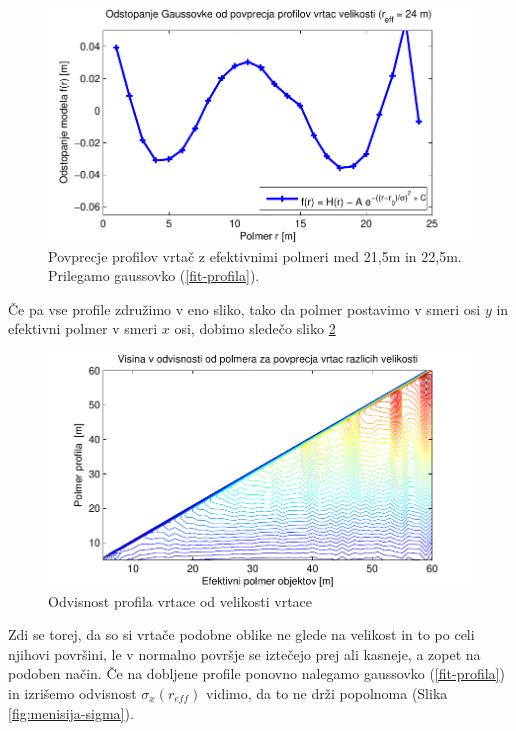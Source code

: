 \documentclass[a4paper, oneside, 12pt]{book}
\begin{document}
\begin{figure}[H]
  \centering
  \includegraphics{slike/menisija-profil-21-fit}
  \caption{Povprecje profilov vrtač z efektivnimi polmeri med 21,5m in 22,5m. Prilegamo gaussovko (\ref{fit-profila}).}
  \label{fig:menisija-profil-21-fit}
\end{figure}

Če pa vse profile združimo v eno sliko, tako da polmer postavimo v smeri osi $y$ in efektivni polmer v smeri $x$ osi, dobimo sledečo sliko \ref{fig:menisija-profil-profilov}

\begin{figure}[H]
  \centering
  \includegraphics{slike/menisija-profil-profilov}
  \caption{Odvisnost profila vrtace od velikosti vrtace}
  \label{fig:menisija-profil-profilov}
\end{figure}

Zdi se torej, da so si vrtače podobne oblike ne glede na velikost in to po celi njihovi površini, le v normalno površje se iztečejo prej ali kasneje, a zopet na podoben način.
Če na dobljene profile ponovno nalegamo gaussovko (\ref{fit-profila}) in izrišemo odvisnost $\sigma_x (r_{eff})$ vidimo, da to ne drži popolnoma  (Slika \ref{fig:menisija-sigma}).  
\end{document}
